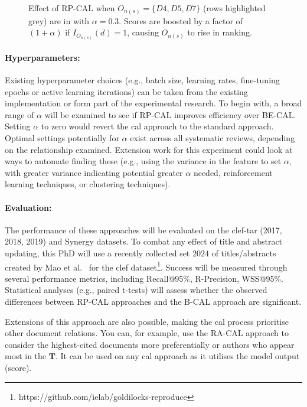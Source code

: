 \documentclass[10pt,oneside]{book}
\begin{document}
\begin{figure}[h!]

\caption{Effect of RP-CAL when $O_{n(s)} = \{D4, D5, D7\}$ (rows highlighted grey) are in  with $\alpha = 0.3$. Scores are boosted by a factor of $(1+\alpha)$ if $I_{O_{n(s)}}(d)=1$, causing  $O_{n(s)}$ to rise in ranking.}
\label{fig:relationship_aware_example}
\end{figure}

\paragraph{Hyperparameters:}
Existing hyperparameter choices (e.g., batch size, learning rates, fine-tuning epochs or active learning iterations) can be taken from the existing implementation or form part of the experimental research. To begin with, a broad range of $\alpha$ will be examined to see if RP-CAL improves efficiency over BE-CAL. Setting $\alpha$ to zero would revert the \gls*{cal} approach to the standard approach. Optimal settings potentially for $\alpha$ exist across all systematic reviews, depending on the relationship examined. Extension work for this experiment could look at ways to automate finding these (e.g., using the variance in the feature to set $\alpha$, with greater variance indicating potential greater $\alpha$ needed, reinforcement learning techniques, or clustering techniques).

\paragraph{Evaluation:}
The performance of these approaches will be evaluated on the \gls*{clef}-\gls*{tar} (2017, 2018, 2019) and Synergy datasets. To combat any effect of title and abstract updating, this PhD will use a recently collected set \(2024\) of titles/abstracts created by Mao et al.~\cite{mao_reproducibility_2024} for the \gls*{clef} dataset\footnote{https://github.com/ielab/goldilocks-reproduce}. Success will be measured through several performance metrics, including Recall@95\%, R-Precision, WSS@95\%. Statistical analyses (e.g., paired t-tests) will assess whether the observed differences between RP-CAL approaches and the B-CAL approach are significant.

Extensions of this approach are also possible, making the \gls*{cal} process prioritise other document relations. You can, for example, use the RA-CAL approach to consider the highest-cited documents more preferentially or authors who appear most in the $\textbf{T}$. It can be used on any \gls*{cal} approach as it utilises the model output (score). 
\end{document}

